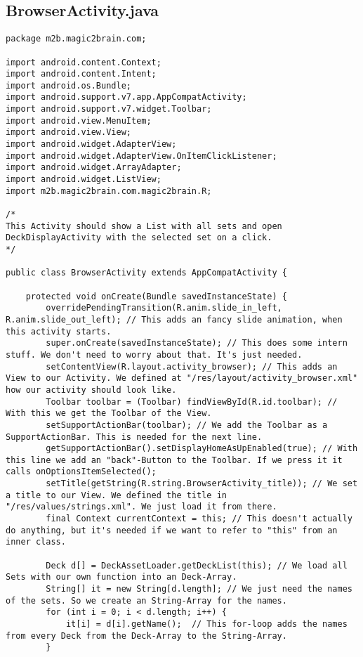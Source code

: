 \subsection*{BrowserActivity.java}
\begin{lstlisting}
package m2b.magic2brain.com;

import android.content.Context;
import android.content.Intent;
import android.os.Bundle;
import android.support.v7.app.AppCompatActivity;
import android.support.v7.widget.Toolbar;
import android.view.MenuItem;
import android.view.View;
import android.widget.AdapterView;
import android.widget.AdapterView.OnItemClickListener;
import android.widget.ArrayAdapter;
import android.widget.ListView;
import m2b.magic2brain.com.magic2brain.R;

/*
This Activity should show a List with all sets and open DeckDisplayActivity with the selected set on a click.
*/

public class BrowserActivity extends AppCompatActivity {

    protected void onCreate(Bundle savedInstanceState) {
        overridePendingTransition(R.anim.slide_in_left, R.anim.slide_out_left); // This adds an fancy slide animation, when this activity starts.
        super.onCreate(savedInstanceState); // This does some intern stuff. We don't need to worry about that. It's just needed.
        setContentView(R.layout.activity_browser); // This adds an View to our Activity. We defined at "/res/layout/activity_browser.xml" how our activity should look like.
        Toolbar toolbar = (Toolbar) findViewById(R.id.toolbar); // With this we get the Toolbar of the View.
        setSupportActionBar(toolbar); // We add the Toolbar as a SupportActionBar. This is needed for the next line.
        getSupportActionBar().setDisplayHomeAsUpEnabled(true); // With this line we add an "back"-Button to the Toolbar. If we press it it calls onOptionsItemSelected();
        setTitle(getString(R.string.BrowserActivity_title)); // We set a title to our View. We defined the title in "/res/values/strings.xml". We just load it from there.
        final Context currentContext = this; // This doesn't actually do anything, but it's needed if we want to refer to "this" from an inner class.

        Deck d[] = DeckAssetLoader.getDeckList(this); // We load all Sets with our own function into an Deck-Array.
        String[] it = new String[d.length]; // We just need the names of the sets. So we create an String-Array for the names.
        for (int i = 0; i < d.length; i++) {
            it[i] = d[i].getName();  // This for-loop adds the names from every Deck from the Deck-Array to the String-Array.
        }


\end{lstlisting}
